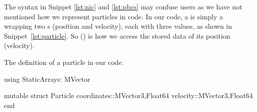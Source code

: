 The syntax in Snippet \ref{lst:nic} and \ref{lst:pbcs} may confuse users as we
have not mentioned how we represent particles in
code. In our code, a  is simply a  wrapping two
s (position and velocity), each with three  values, as shown in
Snippet~\ref{lst:particle}. So  () is how we access the
stored data of its position (velocity).

\begin{algorithm}
    \caption{The definition of a particle in our code.}
    \label{lst:particle}
    \begin{juliacode}
        using StaticArrays: MVector

        mutable struct Particle
            coordinates::MVector{3,Float64}
            velocity::MVector{3,Float64}
        end
    \end{juliacode}
\end{algorithm}

